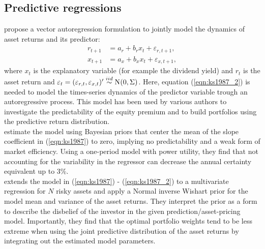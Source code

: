 \subsection{Predictive regressions}
\cite{kandel1987} propose a vector autoregression formulation to jointly model the dynamics of asset returns and its predictor:
\begin{align}
	\label{eqn:ks1987}
	r_{t+1}&=a_r+b_rx_t+\varepsilon_{r,t+1},\\
	x_{t+1}&=a_x+b_xx_t+\varepsilon_{x,t+1},\label{eqn:ks1987_2}
\end{align}
where $x_t$ is the explanatory variable (for example the dividend yield) and $r_t$ is the asset return and $\varepsilon_t=(\varepsilon_{r,t},\varepsilon_{x,t})'\stackrel{iid}{\sim}\No{0,\Sigma}$. Here, equation (\ref{eqn:ks1987_2}) is needed to model the times-series dynamics of the predictor variable trough an autoregressive process. This model has been used by various authors to investigate the predictability of the equity premium and to build portfolios using the predictive return distribution.\\ 
%
%
\indent \cite{kandel1996} estimate the model using Bayesian priors that center the mean of the slope coefficient in (\ref{eqn:ks1987}) to zero, implying no predictability and a weak form of market efficiency. Using a one-period model with power utility, they find that not accounting for the variability in the regressor can decrease the annual certainty equivalent up to 3\%.\\
%
\indent \cite{pastor2000a} extends the model in (\ref{eqn:ks1987}) - (\ref{eqn:ks1987_2}) to a multivariate regression for $N$ risky assets and apply a Normal inverse Wishart prior for the model mean and variance of the asset returns. They interpret the prior as a form to describe the disbelief of the investor in the given prediction/asset-pricing model. Importantly, they find that the optimal portfolio weights tend to be less extreme when using the joint predictive distribution of the asset returns by integrating out the estimated model parameters.%
